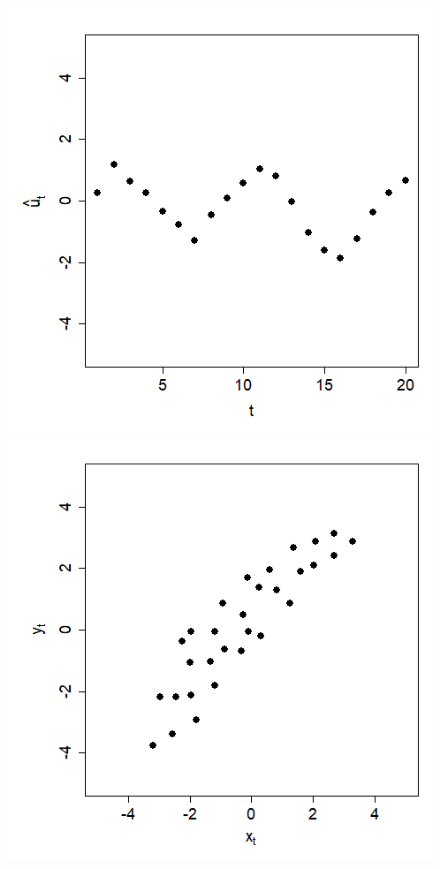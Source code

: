 \documentclass[captions=tableheading, 12pt, headings=small, parskip=half]{scrartcl}
\begin{document}
\begin{figure}[H]
	\begin{minipage}{0.48\columnwidth}
		\includegraphics[width = \columnwidth]{Code2/autoco5.png}
	\end{minipage}
	\hfill
	\begin{minipage}{0.48\columnwidth}
		\includegraphics[width = \columnwidth]{Code2/autoco6.png}
	\end{minipage}
\end{figure}
\end{document}
